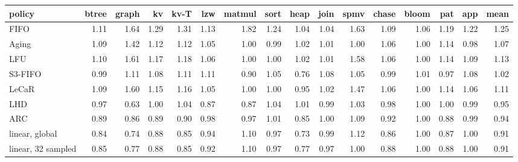 \begin{tabular}{lrrrrrrrrrrrrrrr}
\toprule
policy & btree & graph & kv & kv-T & lzw & matmul & sort & heap & join & spmv & chase & bloom & pat & app & mean \\
\midrule
FIFO & 1.11 & 1.64 & 1.29 & 1.31 & 1.13 & 1.82 & 1.24 & 1.04 & 1.04 & 1.63 & 1.09 & 1.06 & 1.19 & 1.22 & 1.25 \\
Aging & 1.09 & 1.42 & 1.12 & 1.12 & 1.05 & 1.00 & 0.99 & 1.02 & 1.01 & 1.00 & 1.06 & 1.00 & 1.14 & 0.98 & 1.07 \\
LFU & 1.10 & 1.61 & 1.17 & 1.18 & 1.06 & 1.00 & 1.00 & 1.02 & 1.01 & 1.58 & 1.06 & 1.00 & 1.14 & 1.09 & 1.13 \\
S3-FIFO & 0.99 & 1.11 & 1.08 & 1.11 & 1.11 & 0.90 & 1.05 & 0.76 & 1.08 & 1.05 & 0.99 & 1.01 & 0.97 & 1.08 & 1.02 \\
LeCaR & 1.09 & 1.60 & 1.15 & 1.16 & 1.05 & 1.00 & 1.00 & 0.95 & 1.02 & 1.47 & 1.06 & 1.00 & 1.14 & 1.06 & 1.11 \\
LHD & 0.97 & 0.63 & 1.00 & 1.04 & 0.87 & 0.87 & 1.04 & 1.01 & 0.99 & 1.03 & 0.98 & 1.00 & 1.00 & 0.99 & 0.95 \\
ARC & 0.89 & 0.86 & 0.89 & 0.90 & 0.98 & 0.97 & 1.01 & 0.85 & 1.00 & 1.09 & 0.92 & 1.00 & 0.88 & 0.99 & 0.94 \\
linear, global & 0.84 & 0.74 & 0.88 & 0.85 & 0.94 & 1.10 & 0.97 & 0.73 & 0.99 & 1.12 & 0.86 & 1.00 & 0.87 & 1.00 & 0.91 \\
linear, 32 sampled & 0.85 & 0.77 & 0.88 & 0.85 & 0.92 & 1.10 & 0.97 & 0.77 & 0.97 & 1.00 & 0.88 & 1.00 & 0.88 & 1.00 & 0.91 \\
\bottomrule
\end{tabular}
